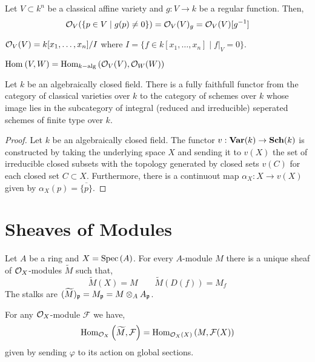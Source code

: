 \documentclass[12pt]{article}
\begin{document}
\begin{corollary}
Let $V \subset k^n$ be a classical affine variety and $g : V \to k$ be a regular function. Then,
\[ \mathcal{O}_{V}(\{p \in V \mid g(p) \neq 0\}) = \mathcal{O}_{V}(V)_g = \mathcal{O}_{V}(V)[g^{-1}] \]
\end{corollary}

\begin{corollary}
$\mathcal{O}_{V}(V) = k[x_1, \dots, x_n] / I$
where $I = \{f \in k[x_1, \dots, x_n] \mid f|_V = 0 \}$.
\end{corollary}

\begin{corollary}
$\mathrm{Hom}_{}\left( V , W \right) = \mathrm{Hom}_{k-\text{alg}} \left( \mathcal{O}_{V}(V), \mathcal{O}_{W}(W) \right)$
\end{corollary}

\begin{theorem}
Let $k$ be an algebraically closed field. There is a fully faithfull functor from the category of classical varieties over $k$ to the category of schemes over $k$ whose image lies in the subcategory of integral (reduced and irreducible) seperated schemes of finite type over $k$. 
\end{theorem}


\begin{proof}
Let $k$ be an algebraically closed field. The functor $v : \mathbf{Var}(k) \to \mathbf{Sch}(k)$ is constructed by taking the underlying space $X$ and sending it to $v(X)$ the set of irreducible closed subsets with the topology generated by closed sets $v(C)$ for each closed set $C \subset X$. Furthermore, there is a continuout map $\alpha_X : X \to v(X)$ given by $\alpha_X(p) = \overline{\{ p \}}$. 
\end{proof}


\section{Sheaves of Modules}

\begin{definition}
Let $A$ be a ring and $X = \mathrm{Spec}\left( A \right)$. For every $A$-module $M$ there is a unique sheaf of $\mathcal{O}_{X}$-modules $\widetilde{M}$ such that,
\[ \widetilde{M}(X) = M \quad \quad \widetilde{M}(D(f)) = M_f \]
The stalks are $(\widetilde{M})_{\mathfrak{p}} = M_{\mathfrak{p}} = M \otimes_A A_{\mathfrak{p}}$. 
\end{definition}

\begin{proposition}
For any $\mathcal{O}_{X}$-module $\mathcal{F}$ we have,
\[ \mathrm{Hom}_{\mathcal{O}_{X}} \left( \widetilde{M}, \mathcal{F} \right) = \mathrm{Hom}_{\mathcal{O}_{X}(X)} \left( M, \mathcal{F}(X) \right) \]
given by sending $\varphi$ to its action on global sections. 
\end{proposition}
\end{document}
